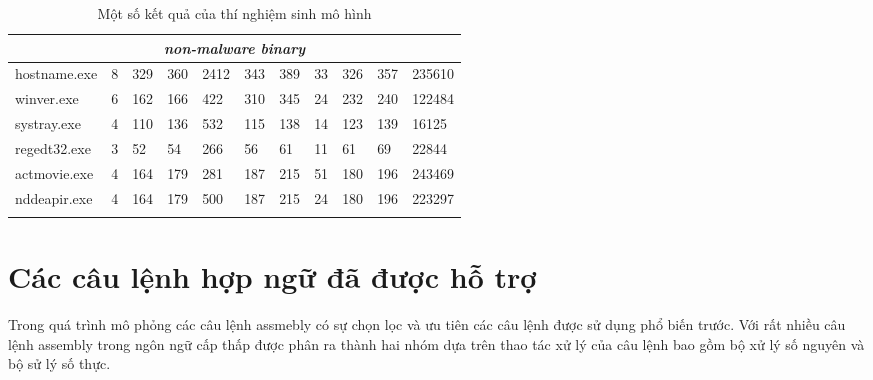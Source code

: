 \begin{small}
\begin{longtable}{|l|l|l|l|l|l|l|l|l|l|l|}
\multicolumn{11}{|c|}{\it non-malware binary}  \\ \hline
hostname.exe	& 8 & 329	& 360 &	2412 &    343 &	389 & 	33 & 326 &  357 & 	235610 \\ \hline
winver.exe	& 6 & 162	& 166 &	422 &	310 &	345 &	24 & 232 &  240 &	122484 \\ \hline
systray.exe	& 4 & 110	& 136 & 532 &	115 & 	138 &	14 & 123 &	139 &	16125 \\ \hline
regedt32.exe	& 3 & 52	& 54  &	266 &	56  &	61  & 	11 & 61  &	69  &	22844 \\ \hline
actmovie.exe	& 4 & 164	& 179 &	281 &	187 & 	215 & 	51 & 180 &	196 &	243469 \\ \hline
nddeapir.exe	& 4& 164	& 179 &	500 &	187 & 	215 & 	24 & 180 &	196 &	223297 \\ \hline

\caption {Một số kết quả của thí nghiệm sinh mô hình}\label{table:virusExp}
\end{longtable}
\end{small}


		\section{Các câu lệnh hợp ngữ đã được hỗ trợ}
		Trong quá trình mô phỏng các câu lệnh assmebly có sự chọn lọc và ưu tiên các câu lệnh được sử dụng phổ biến trước. Với rất nhiều câu lệnh assembly trong ngôn ngữ cấp thấp được phân ra thành hai nhóm dựa trên thao tác xử lý của câu lệnh bao gồm bộ xử lý số nguyên và bộ sử lý số thực. \\ 
		
